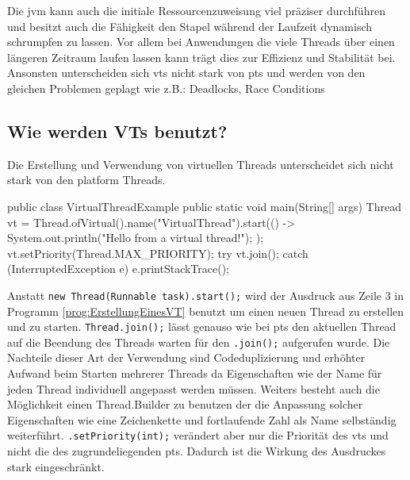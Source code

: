     Die \gls{jvm} kann auch die initiale Ressourcenzuweisung viel präziser durchführen und besitzt auch die Fähigkeit den Stapel während der Laufzeit dynamisch 
    schrumpfen zu lassen. Vor allem bei Anwendungen die viele Threads über einen längeren Zeitraum  laufen lassen kann trägt dies zur Effizienz und Stabilität bei.
    Ansonsten unterscheiden sich \Glspl{vt} nicht stark von \Glspl{pt} und werden von den gleichen Problemen geplagt wie z.B.: Deadlocks, Race Conditions
    \cite{JEP425}


\subsection{Wie werden VTs benutzt?}
\label{subsec:WieWerdenVTsBenutzt?}

    Die Erstellung und Verwendung von virtuellen Threads unterscheidet sich nicht stark von den platform Threads. 
    \begin{program} [H]
        \caption{Erstellung eines \Glspl{vt}}
        \label{prog:ErstellungEinesVT}
    \begin{JavaCode}[language=Java, numbers=left]
public class VirtualThreadExample {
    public static void main(String[] args) {
        Thread vt = Thread.ofVirtual().name("VirtualThread").start(() -> {
            System.out.println("Hello from a virtual thread!");
        });
        vt.setPriority(Thread.MAX_PRIORITY);
        try {
            vt.join();
        } catch (InterruptedException e) {
            e.printStackTrace();
        }
    }
}
    \end{JavaCode}
    \end{program}
    Anstatt \texttt{new Thread(Runnable task).start();} wird der Ausdruck aus Zeile 3 in Programm 
    \ref{prog:ErstellungEinesVT} benutzt um einen neuen Thread zu erstellen und zu starten. \texttt{Thread.join();} lässt genauso wie bei \Glspl{pt} den aktuellen Thread 
    auf die Beendung des Threads warten für den \texttt{.join();} aufgerufen wurde. Die Nachteile dieser Art der Verwendung sind Codeduplizierung und erhöhter Aufwand
    beim Starten mehrerer Threads da Eigenschaften wie der Name für jeden Thread individuell angepasst werden müssen.
    Weiters besteht auch die Möglichkeit einen Thread.Builder zu benutzen der die Anpassung solcher Eigenschaften wie eine Zeichenkette und fortlaufende Zahl
    als Name selbständig weiterführt.
    \texttt{.setPriority(int);} verändert aber nur die Priorität des \Glspl{vt} und nicht die des zugrundeliegenden \Glspl{pt}. Dadurch ist die Wirkung des Ausdruckes
    stark eingeschränkt.
    
